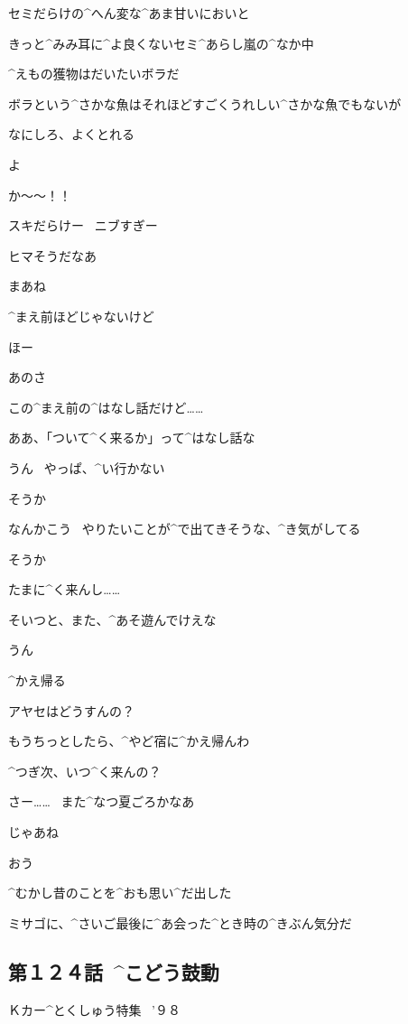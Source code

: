 \page
\Y セミだらけの^{へん}{変}な^{あま}{甘}いにおいと

\Y きっと^{みみ}{耳}に^{よ}{良}くないセミ^{あらし}{嵐}の^{なか}{中}

\page
\Y ^{えもの}{獲物}はだいたいボラだ

\Y ボラという^{さかな}{魚}はそれほどすごくうれしい^{さかな}{魚}でもないが

\Y なにしろ、よくとれる

\page[42]
\M よ

\Y か〜〜！！

\M スキだらけー
\ ニブすぎー

\page
\Y ヒマそうだなあ

\M まあね

\M ^{まえ}{前}ほどじゃないけど

\page
\Y ほー

\M あのさ

\M この^{まえ}{前}の^{はなし}{話}だけど……

\Y ああ、「ついて^{く}{来}るか」って^{はなし}{話}な

\M うん
\ やっぱ、^{い}{行}かない

\Y そうか

\M なんかこう
\ やりたいことが^{で}{出}てきそうな、^{き}{気}がしてる

\Y そうか

\page
\Y たまに^{く}{来}んし……

\Y そいつと、また、^{あそ}{遊}んでけえな

\M うん

\page[47]
\M ^{かえ}{帰}る

\M アヤセはどうすんの？

\Y もうちっとしたら、^{やど}{宿}に^{かえ}{帰}んわ

\M ^{つぎ}{次}、いつ^{く}{来}んの？

\Y さー……
\ また^{なつ}{夏}ごろかなあ

\page[49]
\M じゃあね

\Y おう

\page
\Y ^{むかし}{昔}のことを^{おも}{思}い^{だ}{出}した

\Y ミサゴに、^{さいご}{最後}に^{あ}{会}った^{とき}{時}の^{きぶん}{気分}だ


\subsection{第１２４話\ ^{こどう}{鼓動}}

\page[52]
\Sign Ｋカー^{とくしゅう}{特集}
\ ’９８

